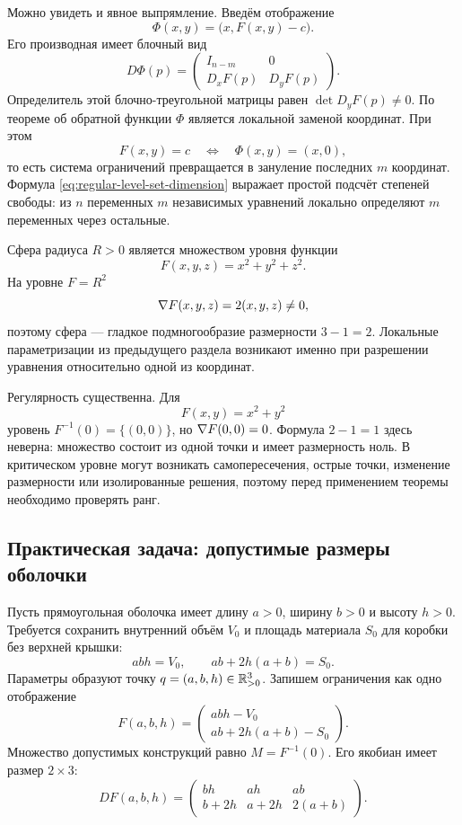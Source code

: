 Можно увидеть и явное выпрямление. Введём отображение
\begin{equation}
\label{eq:level-set-straightening-map}
\Phi(x,y)=\bigl(x,F(x,y)-c\bigr).
\end{equation}
Его производная имеет блочный вид
\[
D\Phi(p)
=
\begin{pmatrix}
I_{n-m}&0\\
D_xF(p)&D_yF(p)
\end{pmatrix}.
\]
Определитель этой блочно-треугольной матрицы равен \(\det D_yF(p)\neq0\). По теореме об обратной функции \(\Phi\) является локальной заменой координат. При этом
\[
F(x,y)=c
\quad\Longleftrightarrow\quad
\Phi(x,y)=(x,0),
\]
то есть система ограничений превращается в зануление последних \(m\) координат. Формула \eqref{eq:regular-level-set-dimension} выражает простой подсчёт степеней свободы: из \(n\) переменных \(m\) независимых уравнений локально определяют \(m\) переменных через остальные.

Сфера радиуса \(R>0\) является множеством уровня функции
\[
F(x,y,z)=x^2+y^2+z^2.
\]
На уровне \(F=R^2\)
\[
\nabla F(x,y,z)=2(x,y,z)\neq0,
\]
поэтому сфера --- гладкое подмногообразие размерности \(3-1=2\). Локальные параметризации из предыдущего раздела возникают именно при разрешении уравнения относительно одной из координат.

Регулярность существенна. Для
\[
F(x,y)=x^2+y^2
\]
уровень \(F^{-1}(0)=\{(0,0)\}\), но \(\nabla F(0,0)=0\). Формула \(2-1=1\) здесь неверна: множество состоит из одной точки и имеет размерность ноль. В критическом уровне могут возникать самопересечения, острые точки, изменение размерности или изолированные решения, поэтому перед применением теоремы необходимо проверять ранг.

\subsection{Практическая задача: допустимые размеры оболочки}

Пусть прямоугольная оболочка имеет длину \(a>0\), ширину \(b>0\) и высоту \(h>0\). Требуется сохранить внутренний объём \(V_0\) и площадь материала \(S_0\) для коробки без верхней крышки:
\begin{equation}
\label{eq:box-design-constraints}
abh=V_0,
\qquad
ab+2h(a+b)=S_0.
\end{equation}
Параметры образуют точку \(q=(a,b,h)\in\mathbb{R}_{>0}^3\). Запишем ограничения как одно отображение
\begin{equation}
\label{eq:box-design-map}
F(a,b,h)
=
\begin{pmatrix}
abh-V_0\\
ab+2h(a+b)-S_0
\end{pmatrix}.
\end{equation}
Множество допустимых конструкций равно \(M=F^{-1}(0)\). Его якобиан имеет размер \(2\times3\):
\begin{equation}
\label{eq:box-design-jacobian}
DF(a,b,h)
=
\begin{pmatrix}
bh&ah&ab\\
b+2h&a+2h&2(a+b)
\end{pmatrix}.
\end{equation}


